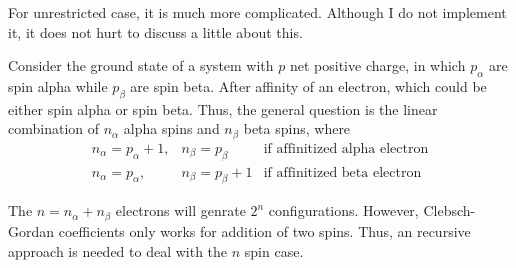 \documentclass[bachelor, english]{ustcthesis}
\begin{document}
For unrestricted case, it is much more complicated.
Although I do not implement it, it does not hurt to discuss a little about this.

Consider the ground state of a system with $p$ net positive charge, in which $p_{\alpha}$ are spin alpha while $p_{\beta}$ are spin beta.
After affinity of an electron, which could be either spin alpha or spin beta.
Thus, the general question is the linear combination of $n_{\alpha}$ alpha spins and $n_{\beta}$ beta spins, where
\begin{equation}
	\begin{array}{lll}
		n_{\alpha}=p_{\alpha} + 1, & n_{\beta}=p_{\beta} & \text{if affinitized alpha electron}
		\\
		n_{\alpha}=p_{\alpha}, & n_{\beta}=p_{\beta} + 1 & \text{if affinitized beta electron}
	\end{array}
\end{equation}

The $n=n_{\alpha} + n_{\beta}$ electrons will genrate $2^n$ configurations.
However, Clebsch-Gordan coefficients only works for addition of two spins.
Thus, an recursive approach is needed to deal with the $n$ spin case.





\appendix


\backmatter


\end{document}

